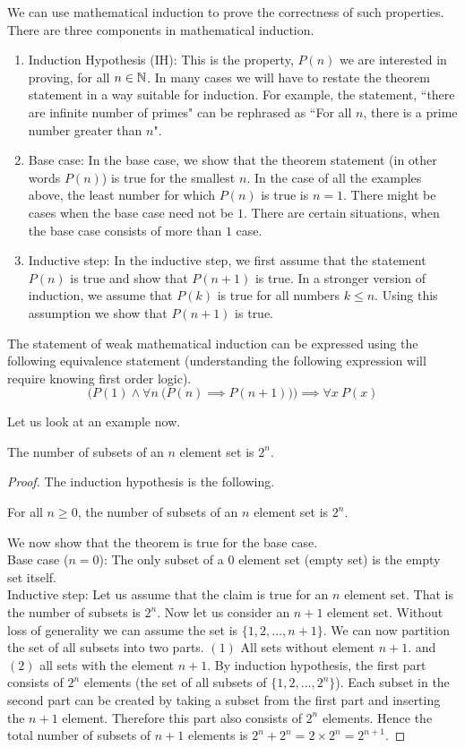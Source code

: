 We can use mathematical induction to prove the correctness of such properties. There are three components in mathematical induction. 
\begin{enumerate}
\item Induction Hypothesis (IH): This is the property, $P(n)$ we are interested in proving, for all $n \in \mathbb{N}$. In many cases we will have to restate the theorem statement in a way suitable for induction. For example, the statement, ``there are infinite number of primes" can be rephrased as ``For all $n$, there is a prime number greater than $n$".
\item Base case: In the base case, we show that the theorem statement (in other words $P(n)$) is true for the smallest $n$. In the case of all the examples above, the least number for which $P(n)$ is true is $n=1$. There might be cases when the base case need not be $1$. There are certain situations, when the base case consists of more than $1$ case.
\item Inductive step: In the inductive step, we first assume that the statement $P(n)$ is true and show that $P(n+1)$ is true. In a stronger version of induction, we assume that $P(k)$ is true for all numbers $k \leq n$. Using this assumption we show that $P(n+1)$ is true.
\end{enumerate}

The statement of weak mathematical induction can be expressed using the following equivalence statement (understanding the following expression will require knowing first order logic).
\[
\Big(P(1) \wedge \forall n ~\big(P(n) \implies P(n+1)\big)\Big) \implies \forall x ~P(x)  
\]

Let us look at an example now.
\begin{theorem}
The number of subsets of an $n$ element set is $2^n$.
\end{theorem}
\begin{proof}
The induction hypothesis is the following.

\centerline{For all $n \geq 0$, the number of subsets of an $n$ element set is $2^n$.}
We now show that the theorem is true for the base case. \\
Base case ($n=0$): The only subset of a $0$ element set (empty set) is the empty set itself. \\
Inductive step: Let us assume that the claim is true for an $n$ element set. That is the number of subsets is $2^n$. Now let us consider an $n+1$ element set. Without loss of generality we can assume the set is $\{1,2,\dots,n+1\}$. We can now partition the set of all subsets into two parts. $(1)$ All sets without element $n+1$. and $(2)$ all sets with the element $n+1$. By induction hypothesis, the first part consists of $2^n$ elements (the set of all subsets of $\{1,2,\dots,2^n\}$). Each subset in the second part can be created by taking a subset from the first part and inserting the $n+1$ element. Therefore this part also consists of $2^n$ elements. Hence the total number of subsets of $n+1$ elements is $2^n + 2^n = 2 \times 2^n = 2^{n+1}$.
\end{proof}

